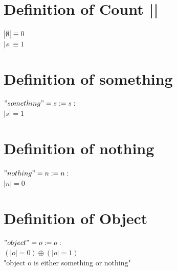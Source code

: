 \documentclass[11pt]{article}
\begin{document}
\section{Definition of Count ||}
\begin{center}
$
|\emptyset| \equiv 0
$
\\ \vspace{2mm}
$
|s| \equiv 1
$
\end{center}





\section{Definition of something}
\begin{center}
$
"something" = s  := s:
$
\\ \vspace{2mm}
$
|s| = 1
$
\end{center}











\section{Definition of nothing}
\begin{center}
$
"nothing" = n := n:
$
\\ \vspace{2mm}
$
|n| = 0
$
\end{center}






\section{Definition of Object}
\begin{center}
$
"object" = o:= o:
$
\\ \vspace{2mm}
$
(|o| = 0) \oplus (|o| = 1)
$
\\ \vspace{2mm}
"object o is either something or nothing"
\end{center}
\end{document}

